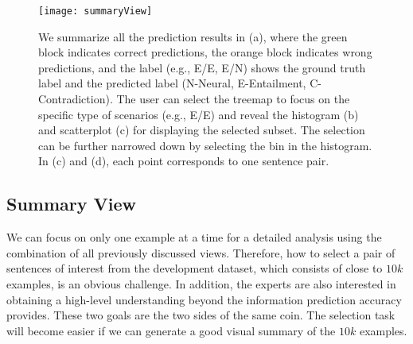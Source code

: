 \begin{figure}[htbp]
\centering
\vspace{-2mm}
 \texttt{[image: summaryView]}
 \vspace{-6mm}
 \caption{
We summarize all the prediction results in (a), where the green block indicates correct predictions, the orange block indicates wrong predictions, and the label (e.g., E/E, E/N) shows the ground truth label and the predicted label (N-Neural, E-Entailment, C-Contradiction).
%
The user can select the treemap to focus on the specific type of scenarios (e.g., E/E) and reveal the histogram (b) and scatterplot (c) for displaying the selected subset.
The selection can be further narrowed down by selecting the bin in the histogram.
In (c) and (d), each point corresponds to one sentence pair.
 }
 \vspace{-2mm}
\label{fig:summaryView}
\end{figure}

\subsection{Summary View}
\label{sec:allPairs}
We can focus on only one example at a time for a detailed analysis using the combination of all previously discussed views. Therefore, how to select a pair of sentences of interest from the development dataset, which consists of close to $10k$ examples, is an obvious challenge.
In addition, the experts are also interested in obtaining a high-level understanding beyond the information prediction accuracy provides.%
%
These two goals are the two sides of the same coin. 
The selection task will become easier if we can generate a good visual summary of the $10k$ examples.%

